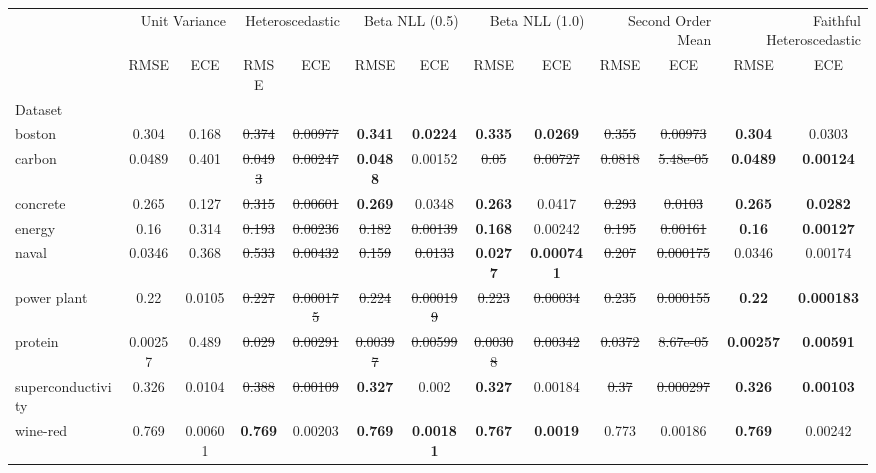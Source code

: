 \begin{tabular}{l|cc|cc|cc|cc|cc|cc}
\toprule
{} & \multicolumn{2}{r}{Unit Variance} & \multicolumn{2}{r}{Heteroscedastic} & \multicolumn{2}{r}{Beta NLL (0.5)} & \multicolumn{2}{r}{Beta NLL (1.0)} & \multicolumn{2}{r}{Second Order Mean} & \multicolumn{2}{r}{Faithful Heteroscedastic} \\
{} & {RMSE} & {ECE} & {RMSE} & {ECE} & {RMSE} & {ECE} & {RMSE} & {ECE} & {RMSE} & {ECE} & {RMSE} & {ECE} \\
{Dataset} & {} & {} & {} & {} & {} & {} & {} & {} & {} & {} & {} & {} \\
\midrule
boston & 0.304 & 0.168 & \sout{0.374} & \sout{0.00977} & \textbf{0.341} & \textbf{0.0224} & \textbf{0.335} & \textbf{0.0269} & \sout{0.355} & \sout{0.00973} & \textbf{0.304} & 0.0303 \\
carbon & 0.0489 & 0.401 & \sout{0.0493} & \sout{0.00247} & \textbf{0.0488} & 0.00152 & \sout{0.05} & \sout{0.00727} & \sout{0.0818} & \sout{5.48e-05} & \textbf{0.0489} & \textbf{0.00124} \\
concrete & 0.265 & 0.127 & \sout{0.315} & \sout{0.00601} & \textbf{0.269} & 0.0348 & \textbf{0.263} & 0.0417 & \sout{0.293} & \sout{0.0103} & \textbf{0.265} & \textbf{0.0282} \\
energy & 0.16 & 0.314 & \sout{0.193} & \sout{0.00236} & \sout{0.182} & \sout{0.00139} & \textbf{0.168} & 0.00242 & \sout{0.195} & \sout{0.00161} & \textbf{0.16} & \textbf{0.00127} \\
naval & 0.0346 & 0.368 & \sout{0.533} & \sout{0.00432} & \sout{0.159} & \sout{0.0133} & \textbf{0.0277} & \textbf{0.000741} & \sout{0.207} & \sout{0.000175} & 0.0346 & 0.00174 \\
power plant & 0.22 & 0.0105 & \sout{0.227} & \sout{0.000175} & \sout{0.224} & \sout{0.000199} & \sout{0.223} & \sout{0.00034} & \sout{0.235} & \sout{0.000155} & \textbf{0.22} & \textbf{0.000183} \\
protein & 0.00257 & 0.489 & \sout{0.029} & \sout{0.00291} & \sout{0.00397} & \sout{0.00599} & \sout{0.00308} & \sout{0.00342} & \sout{0.0372} & \sout{8.67e-05} & \textbf{0.00257} & \textbf{0.00591} \\
superconductivity & 0.326 & 0.0104 & \sout{0.388} & \sout{0.00109} & \textbf{0.327} & 0.002 & \textbf{0.327} & 0.00184 & \sout{0.37} & \sout{0.000297} & \textbf{0.326} & \textbf{0.00103} \\
wine-red & 0.769 & 0.00601 & \textbf{0.769} & 0.00203 & \textbf{0.769} & \textbf{0.00181} & \textbf{0.767} & \textbf{0.0019} & 0.773 & 0.00186 & \textbf{0.769} & 0.00242 \\

\end{tabular}

